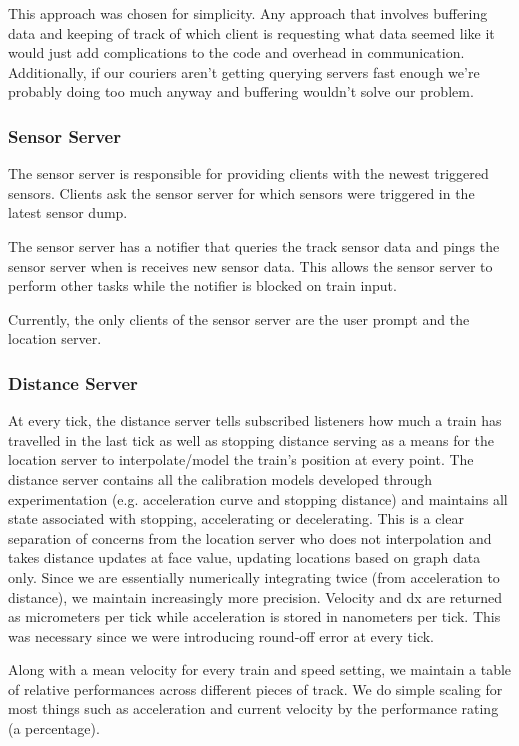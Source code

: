 \documentclass[letterpaper]{article}
\begin{document}
This approach was chosen for simplicity. Any approach that involves buffering data and keeping of track of which client is requesting what data seemed like it would just add complications to the code and overhead in communication. Additionally, if our couriers aren't getting querying servers fast enough we're probably doing too much anyway and buffering wouldn't solve our problem.

\subsubsection{Sensor Server}

The sensor server is responsible for providing clients with the newest triggered sensors. Clients ask the sensor server for which sensors were triggered in the latest sensor dump.

The sensor server has a notifier that queries the track sensor data and pings the sensor server when is receives new sensor data. This allows the sensor server to perform other tasks while the notifier is blocked on train input.

Currently, the only clients of the sensor server are the user prompt and the location server.

\subsubsection{Distance Server}

At every tick, the distance server tells subscribed listeners how much a train has travelled in the last tick as well as stopping distance serving as a means for the location server to interpolate/model the train's position at every point. The distance server contains all the calibration models developed through experimentation (e.g. acceleration curve and stopping distance) and maintains all state associated with stopping, accelerating or decelerating. This is a clear separation of concerns from the location server who does not interpolation and takes distance updates at face value, updating locations based on graph data only. Since we are essentially numerically integrating twice (from acceleration to distance), we maintain increasingly more precision. Velocity and dx are returned as micrometers per tick while acceleration is stored in nanometers per tick. This was necessary since we were introducing round-off error at every tick.

Along with a mean velocity for every train and speed setting, we maintain a table of relative performances across different pieces of track. We do simple scaling for most things such as acceleration and current velocity by the performance rating (a percentage).
\end{document}
